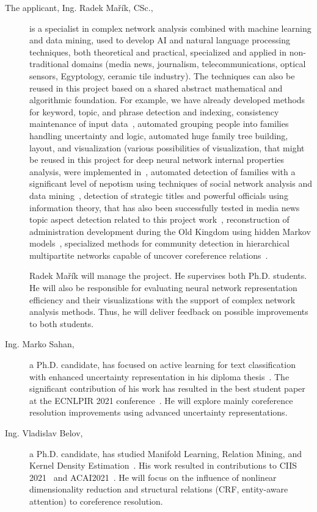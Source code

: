 \begin{description}
	\item [The applicant, Ing. Radek Mařík, CSc.,]  is a specialist in complex network analysis combined with machine learning and data mining, used to develop AI and natural language processing techniques, both theoretical and practical, specialized and applied in non-traditional domains (media news, journalism, telecommunications, optical sensors, Egyptology, ceramic tile industry). The techniques can also be reused in this project based on a shared abstract mathematical and algorithmic foundation. For example, we have already developed methods for keyword, topic, and phrase detection and indexing, consistency maintenance of input data~\cite{Marik2016c}, automated grouping people into families handling uncertainty and logic, automated huge family tree building, layout, and visualization (various possibilities of visualization, that might be reused in this project for deep neural network internal properties analysis, were implemented in~\cite{Marik2016,Marik2016b,Marik2017d,Marik2017,Marik2018a,Marik2019a}, automated detection of families with a significant level of nepotism using techniques of social network analysis and data mining~\cite{Dulikova2015,Dulikova2017b}, detection of strategic titles and powerful officials using information theory, that has also been successfully tested in media news topic aspect detection related to this project work~\cite{Marik2018c}, reconstruction of administration development during the Old Kingdom using hidden Markov models~\cite{Dulikova2017b,Marik2017e}, specialized methods for community detection in hierarchical multipartite networks capable of uncover coreference relations~\cite{Marik2018d,Belov2020,Zikmund2020}. 
	
	Radek Mařík will manage the project. He supervises both Ph.D. students. He will also be responsible for evaluating neural network representation efficiency and their visualizations with the support of complex network analysis methods. Thus, he will deliver feedback on possible improvements to both students.

\item [Ing. Marko Sahan,] a Ph.D. candidate, has focused on active learning for text classification with enhanced uncertainty representation in his diploma thesis~\cite{Sahan2020}. The significant contribution of his work has resulted in the best student paper at the ECNLPIR 2021 conference~\cite{sahan2021active}. He will explore mainly coreference resolution improvements using advanced uncertainty representations.

\item [Ing. Vladislav Belov,] a Ph.D. candidate, has studied Manifold Learning, Relation Mining, and Kernel Density Estimation~\cite{Belov2020}. His work resulted in contributions to CIIS 2021~\cite{Belov2021ML} and ACAI2021~\cite{Belov2021KDE}. He will focus on the influence of nonlinear dimensionality reduction and structural relations (CRF, entity-aware attention) to coreference resolution.

\end{description}

